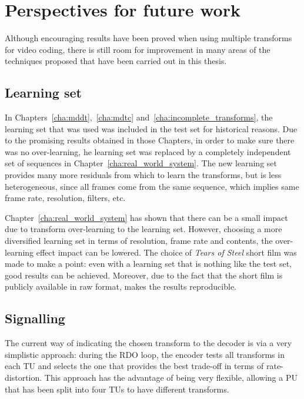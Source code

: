 \documentclass[11pt,a4paper,openright,twoside]{book}
\numberwithin{equation}{section} %
\numberwithin{figure}{section} %
\numberwithin{table}{section} %
\begin{document}
\section*{Perspectives for future work}
\label{sec:perspectives_for_future_work}

Although encouraging results have been proved when using multiple transforms
for video coding, there is still room for improvement in many areas of the
techniques proposed that have been carried out in this thesis.

\subsection*{Learning set}
\label{sub:learning_set}

In Chapters~\ref{cha:mddt},~\ref{cha:mdtc}
and~\ref{cha:incomplete_transforms}, the learning set that was used was
included in the test set for historical reasons.
Due to the promising results obtained in those Chapters, in order to make sure
there was no over-learning, he learning set was replaced by a completely
independent set of sequences in Chapter~\ref{cha:real_world_system}.
The new learning set provides many more residuals from which to learn the
transforms, but is less heterogeneous, since all frames come from the same
sequence, which implies same frame rate, resolution, filters, etc.

Chapter~\ref{cha:real_world_system} has shown that there can be a small impact
due to transform over-learning to the learning set.
However, choosing a more diversified learning set in terms of resolution,
frame rate and contents, the over-learning effect impact can be lowered.
The choice of \emph{Tears of Steel} short film was made to make a point:
even with a learning set that is nothing like the test set, good results can
be achieved.
Moreover, due to the fact that the short film is publicly available in raw
format, makes the results reproducible.

\subsection*{Signalling}
\label{sub:signalling}

The current way of indicating the chosen transform to the decoder is via a
very simplistic approach:
during the \ac{RDO} loop, the encoder tests all transforms in each \ac{TU} and
selects the one that provides the best trade-off in terms of rate-distortion.
This approach has the advantage of being very flexible, allowing a \ac{PU}
that has been split into four \acp{TU} to have different transforms.
\end{document}
